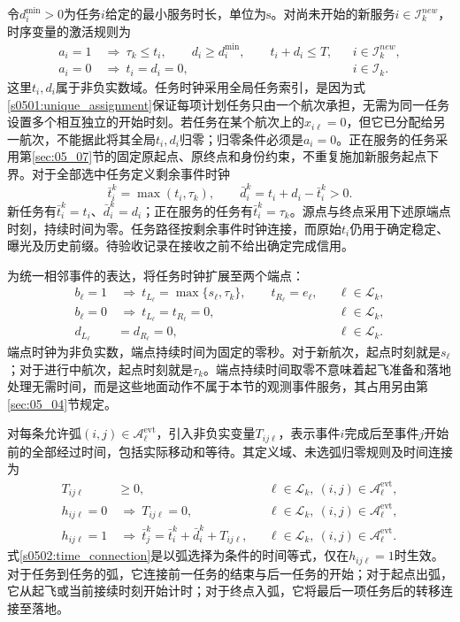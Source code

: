 令$d_i^{\min}>0$为任务$i$给定的最小服务时长，单位为$\mathrm{s}$。对尚未开始的新服务$i\in\mathcal I_k^{new}$，时序变量的激活规则为
\begin{align}
 a_i=1&\ \Longrightarrow\ 
 \tau_k\le t_i,\qquad d_i\ge d_i^{\min},\qquad t_i+d_i\le T,
 &&i\in\mathcal I_k^{new},
 \label{s0502:task_time_domain}\\
 a_i=0&\ \Longrightarrow\ t_i=d_i=0,
 &&i\in\mathcal I_k.
 \label{s0502:inactive_task_times}
\end{align}
这里$t_i,d_i$属于非负实数域。任务时钟采用全局任务索引，是因为式\eqref{s0501:unique_assignment}保证每项计划任务只由一个航次承担，无需为同一任务设置多个相互独立的开始时刻。若任务在某个航次上的$x_{i\ell}=0$，但它已分配给另一航次，不能据此将其全局$t_i,d_i$归零；归零条件必须是$a_i=0$。正在服务的任务采用第\ref{sec:05_07}节的固定原起点、原终点和身份约束，不重复施加新服务起点下界。对于全部选中任务定义剩余事件时钟
\begin{equation}
 \bar t_i^k=\max(t_i,\tau_k),\qquad
 \bar d_i^k=t_i+d_i-\bar t_i^k>0.
 \label{s0502:remaining_event_clock}
\end{equation}
新任务有$\bar t_i^k=t_i$、$\bar d_i^k=d_i$；正在服务的任务有$\bar t_i^k=\tau_k$。源点与终点采用下述原端点时刻，持续时间为零。任务路径按剩余事件时钟连接，而原始$t_i$仍用于确定稳定、曝光及历史前缀。待验收记录在接收之前不给出确定完成信用。


为统一相邻事件的表达，将任务时钟扩展至两个端点：
\begin{align}
 b_\ell=1&\ \Longrightarrow\
 t_{L_\ell}=\max\{s_\ell,\tau_k\},\qquad
 t_{R_\ell}=e_\ell,
 &&\ell\in\mathcal L_k,
 \label{s0502:endpoint_times}\\
 b_\ell=0&\ \Longrightarrow\
 t_{L_\ell}=t_{R_\ell}=0,
 &&\ell\in\mathcal L_k,
 \label{s0502:inactive_endpoint_times}\\
 d_{L_\ell}&=d_{R_\ell}=0,
 &&\ell\in\mathcal L_k.
 \label{s0502:endpoint_durations}
\end{align}
端点时钟为非负实数，端点持续时间为固定的零秒。对于新航次，起点时刻就是$s_\ell$；对于进行中航次，起点时刻就是$\tau_k$。端点持续时间取零不意味着起飞准备和落地处理无需时间，而是这些地面动作不属于本节的观测事件服务，其占用另由第\ref{sec:05_04}节规定。

对每条允许弧$(i,j)\in\mathcal A_\ell^{\mathrm{evt}}$，引入非负实变量$T_{ij\ell}$，表示事件$i$完成后至事件$j$开始前的全部经过时间，包括实际移动和等待。其定义域、未选弧归零规则及时间连接为
\begin{align}
 T_{ij\ell}&\ge0,
 &&\ell\in\mathcal L_k,\ (i,j)\in\mathcal A_\ell^{\mathrm{evt}},
 \label{s0502:transfer_domain}\\
 h_{ij\ell}=0&\ \Longrightarrow\ T_{ij\ell}=0,
 &&\ell\in\mathcal L_k,\ (i,j)\in\mathcal A_\ell^{\mathrm{evt}},
 \label{s0502:inactive_transfer}\\
 h_{ij\ell}=1&\ \Longrightarrow\
 \bar t_j^k=\bar t_i^k+\bar d_i^k+T_{ij\ell},
 &&\ell\in\mathcal L_k,\ (i,j)\in\mathcal A_\ell^{\mathrm{evt}}.
 \label{s0502:time_connection}
\end{align}
式\eqref{s0502:time_connection}是以弧选择为条件的时间等式，仅在$h_{ij\ell}=1$时生效。对于任务到任务的弧，它连接前一任务的结束与后一任务的开始；对于起点出弧，它从起飞或当前接续时刻开始计时；对于终点入弧，它将最后一项任务后的转移连接至落地。

